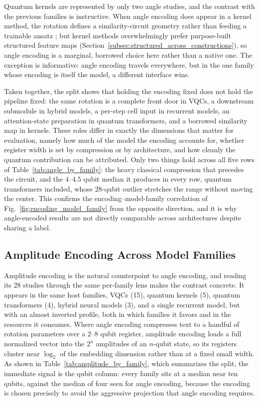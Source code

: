 \documentclass{ieeeaccess}
\begin{document}
Quantum kernels are represented by only two angle studies, and the contrast with the previous families is instructive. When angle encoding does appear in a kernel method, the rotation defines a similarity-circuit geometry rather than feeding a trainable ansatz \cite{hsu_quantum_2025,boopalamani_quantum-enhanced_2025}; but kernel methods overwhelmingly prefer purpose-built structured feature maps (Section~\ref{subsec:structured_across_constructions}), so angle encoding is a marginal, borrowed choice here rather than a native one. The exception is informative: angle encoding travels everywhere, but in the one family whose encoding is itself the model, a different interface wins.

Taken together, the split shows that holding the encoding fixed does not hold the pipeline fixed: the same rotation is a complete front door in VQCs, a downstream submodule in hybrid models, a per-step cell input in recurrent models, an attention-state preparation in quantum transformers, and a borrowed similarity map in kernels. These roles differ in exactly the dimensions that matter for evaluation, namely how much of the model the encoding accounts for, whether register width is set by compression or by architecture, and how cleanly the quantum contribution can be attributed. Only two things hold across all five rows of Table~\ref{tab:angle_by_family}: the heavy classical compression that precedes the circuit, and the $4$--$4.5$ qubit median it produces in every row, quantum transformers included, whose 28-qubit outlier stretches the range without moving the center. This confirms the encoding--model-family correlation of Fig.~\ref{fig:encoding_model_family} from the opposite direction, and it is why angle-encoded results are not directly comparable across architectures despite sharing a label.

\subsection{Amplitude Encoding Across Model Families}
\label{subsec:amplitude_across_families}

Amplitude encoding is the natural counterpoint to angle encoding, and reading its 28 studies through the same per-family lens makes the contrast concrete. It appears in the same host families, VQCs (15), quantum kernels (5), quantum transformers (4), hybrid neural models (3), and a single recurrent model, but with an almost inverted profile, both in which families it favors and in the resources it consumes. Where angle encoding compresses text to a handful of rotation parameters over a $2$--$8$ qubit register, amplitude encoding loads a full normalized vector into the $2^{n}$ amplitudes of an $n$-qubit state, so its registers cluster near $\log_2$ of the embedding dimension rather than at a fixed small width. As shown in Table~\ref{tab:amplitude_by_family}, which summarizes the split, the immediate signal is the qubit column: every family sits at a median near ten qubits, against the median of four seen for angle encoding, because the encoding is chosen precisely to avoid the aggressive projection that angle encoding requires.
\end{document}
